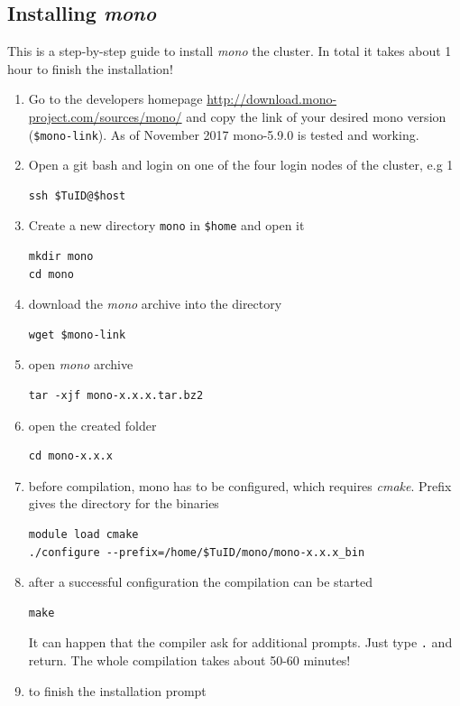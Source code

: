 \documentclass[11pt,twoside,a4paper]{fdyartcl}
\begin{document}
\subsection{Installing \emph{mono}}
\label{sec:mono}
This is a step-by-step guide to install \emph{mono} the cluster. In total it takes about 1 hour to finish the installation!
\begin{enumerate}
\item Go to the developers homepage \url{http://download.mono-project.com/sources/mono/} and copy the link of your desired mono version (\verb|$mono-link|). As of November 2017 mono-5.9.0 is tested and working.
\item Open a git bash and login on one of the four login nodes of the cluster, e.g 1
\begin{verbatim}
ssh $TuID@$host
\end{verbatim}
\item Create a new directory \verb|mono| in \verb|$home| and open it
\begin{verbatim}
mkdir mono
cd mono
\end{verbatim}
\item download the \emph{mono} archive into the directory
\begin{verbatim}
wget $mono-link
\end{verbatim}
\item open \emph{mono} archive
\begin{verbatim}
tar -xjf mono-x.x.x.tar.bz2
\end{verbatim}
\item open the created folder
\begin{verbatim}
cd mono-x.x.x
\end{verbatim}
\item before compilation, mono has to be configured, which requires \emph{cmake}. Prefix gives the directory for the binaries
\begin{verbatim}
module load cmake
./configure --prefix=/home/$TuID/mono/mono-x.x.x_bin
\end{verbatim} 
\item after a successful configuration the compilation can be started
\begin{verbatim}
make
\end{verbatim}
It can happen that the compiler ask for additional prompts. Just type \verb|.| and return.
The whole compilation takes about 50-60 minutes!
\item to finish the installation prompt
\begin{verbatim}

\end{verbatim}
\end{enumerate}
\end{document}
